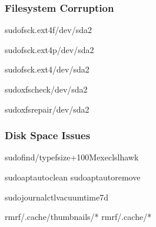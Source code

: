 \documentclass[letterpaper,10pt,english]{sphinxmanual}
\begin{document}
\subsubsection{Filesystem Corruption}
\label{\detokenize{ubuntu-setup:filesystem-corruption}}
\begin{sphinxVerbatim}[commandchars=\\\{\}]
sudofsck.ext4\PYGZhy{}f/dev/sda2

sudofsck.ext4\PYGZhy{}p/dev/sda2

sudofsck.ext4/dev/sda2

sudoxfs\PYGZus{}check/dev/sda2

sudoxfs\PYGZus{}repair/dev/sda2
\end{sphinxVerbatim}


\subsubsection{Disk Space Issues}
\label{\detokenize{ubuntu-setup:disk-space-issues}}
\begin{sphinxVerbatim}[commandchars=\\\{\}]
sudofind/\PYGZhy{}typef\PYGZhy{}size+100M\PYGZhy{}execls\PYGZhy{}lhawk

sudoaptautoclean
sudoaptautoremove

sudojournalctl\PYGZhy{}\PYGZhy{}vacuum\PYGZhy{}time7d

rm\PYGZhy{}rf\PYGZti{}/.cache/thumbnails/*
rm\PYGZhy{}rf\PYGZti{}/.cache/*
\end{sphinxVerbatim}
\end{document}
